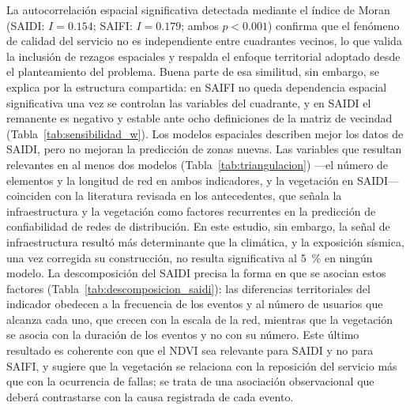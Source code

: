 La autocorrelación espacial significativa detectada mediante el índice de Moran (SAIDI: $I=0{.}154$; SAIFI: $I=0{.}179$; ambos $p<0{.}001$) confirma que el fenómeno de calidad del servicio no es independiente entre cuadrantes vecinos, lo que valida la inclusión de rezagos espaciales y respalda el enfoque territorial adoptado desde el planteamiento del problema. Buena parte de esa similitud, sin embargo, se explica por la estructura compartida: en SAIFI no queda dependencia espacial significativa una vez se controlan las variables del cuadrante, y en SAIDI el remanente es negativo y estable ante ocho definiciones de la matriz de vecindad (Tabla~\ref{tab:sensibilidad_w}). Los modelos espaciales describen mejor los datos de SAIDI, pero no mejoran la predicción de zonas nuevas. Las variables que resultan relevantes en al menos dos modelos (Tabla~\ref{tab:triangulacion}) ---el número de elementos y la longitud de red en ambos indicadores, y la vegetación en SAIDI--- coinciden con la literatura revisada en los antecedentes, que señala la infraestructura y la vegetación como factores recurrentes en la predicción de confiabilidad de redes de distribución. En este estudio, sin embargo, la señal de infraestructura resultó más determinante que la climática, y la exposición sísmica, una vez corregida su construcción, no resulta significativa al $5$~\% en ningún modelo. La descomposición del SAIDI precisa la forma en que se asocian estos factores (Tabla~\ref{tab:descomposicion_saidi}): las diferencias territoriales del indicador obedecen a la frecuencia de los eventos y al número de usuarios que alcanza cada uno, que crecen con la escala de la red, mientras que la vegetación se asocia con la duración de los eventos y no con su número. Este último resultado es coherente con que el NDVI sea relevante para SAIDI y no para SAIFI, y sugiere que la vegetación se relaciona con la reposición del servicio más que con la ocurrencia de fallas; se trata de una asociación observacional que deberá contrastarse con la causa registrada de cada evento.

